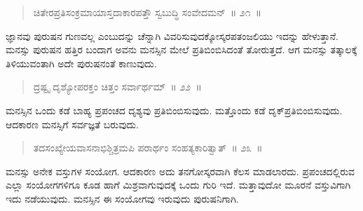 \vspace{-0.3cm}

\begin{verse}
ಚಿತೇರಪ್ರತಿಸಂಕ್ರಮಾಯಾಸ್ತದಾಕಾರಪತ್ತೌ ಸ್ವಬುದ್ಧಿ ಸಂವೇದಮನ್​~॥ ೨೧~॥
\end{verse}

\vspace{-0.35cm}


\vspace{0.2cm}

ಜ್ಞಾನವು ಪುರುಷನ ಗುಣವಲ್ಲ ಎಂಬುದನ್ನು ಚೆನ್ನಾಗಿ ವಿವರಿಸುವುದಕ್ಕೋಸ್ಕರ\break ಪತಂಜಲಿಯು ಇದನ್ನು ಹೇಳುತ್ತಾನೆ. ಮನಸ್ಸು ಪುರುಷನ ಹತ್ತಿರ ಬಂದಾಗ ಅವನು ಮನಸ್ಸಿನ ಮೇಲೆ ಪ್ರತಿಬಿಂಬಿಸಿದಂತೆ ತೋರುತ್ತದೆ. ಆಗ ಮನಸ್ಸು ತತ್ಕಾಲಕ್ಕೆ ತಿಳಿಯುವಂತಾಗಿ ಅದೇ ಪುರುಷನಂತೆ ಕಾಣುವುದು. 

\vspace{-0.2cm}

\begin{verse}
ದ್ರಷ್ಟೃ ದೃಶ್ಯೋಪರಕ್ತಂ ಚಿತ್ತಂ ಸರ್ವಾರ್ಥಮ್​~॥ ೨೨~॥
\end{verse}

\vspace{-0.35cm}


\vspace{0.2cm}

ಮನಸ್ಸಿನ ಒಂದು ಕಡೆ ಬಾಹ್ಯ ಪ್ರಪಂಚದ ದೃಶ್ಯವು ಪ್ರತಿಬಿಂಬಿಸುವುದು. ಮತ್ತೊಂದು ಕಡೆ ದೃಕ್​ ಪ್ರತಿಬಿಂಬಿಸುವುದು. ಆದಕಾರಣ ಮನಸ್ಸಿಗೆ ಸರ್ವಜ್ಞತೆ ಬರುವುದು. 

\vspace{-0.2cm}

\begin{verse}
ತದಸಂಖ್ಯೇಯವಾಸನಾಭಿಶ್ಚಿತ್ರಮಪಿ ಪರಾರ್ಥಂ ಸಂಹತ್ಯಕಾರಿತ್ವಾತ್​~॥ ೨೩~॥
\end{verse}

\vspace{-0.35cm}


\vspace{0.2cm}

ಮನಸ್ಸು ಅನೇಕ ವಸ್ತುಗಳ ಸಂಯೋಗ. ಆದಕಾರಣ ಅದು ತನಗೋಸ್ಕರವಾಗಿ ಕೆಲಸ ಮಾಡಲಾರದು. ಪ್ರಪಂಚದಲ್ಲಿರುವ ಎಲ್ಲಾ ಸಂಯೋಗಗಳಿಗೂ ಕೂಡ ಹಾಗೆ ಮಿಶ್ರವಾಗುವುದಕ್ಕೆ ಒಂದು ಗುರಿ ಇದೆ. ಮತ್ತಾವುದೋ ಮೂರನೆ ವಸ್ತುವಿಗಾಗಿ ಇದು ನಡೆಯುವುದು. ಮನಸ್ಸಿನ ಈ ಸಂಯೋಗವು ಇರುವುದು ಪುರುಷನಿಗಾಗಿ. 

